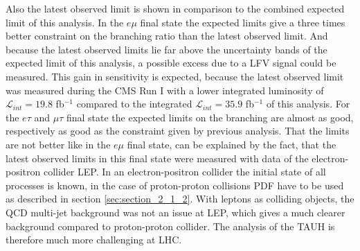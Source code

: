 Also the latest observed limit is shown in comparison to the combined expected limit of this analysis. In the $e\mu$ final state the expected limits give a three times better constraint on the branching ratio than the latest observed limit. And because the latest observed limits lie far above the uncertainty bands of the expected limit of this analysis, a possible excess due to a \gls{LFV} signal could be measured. This gain in sensitivity is expected, because the latest observed limit was measured during the \gls{CMS} Run I with a lower integrated luminosity of $\mathcal{L}_{int} = 19.8$ fb$^{-1}$ compared to the integrated $\mathcal{L}_{int} = 35.9$ fb$^{-1}$ of this analysis. For the $e\tau$ and $\mu\tau$ final state the expected limits on the branching are almost as good, respectively as good as the constraint given by previous analysis. That the limits are not better like in the $e\mu$ final state, can be explained by the fact, that the latest observed limits in this final state were measured with data of the electron-positron collider \gls{LEP}. In an electron-positron collider the initial state of all processes is known, in the case of proton-proton collisions \gls{PDF} have to be used as described in section \ref{sec:section_2_1_2}. With leptons as colliding objects, the \gls{QCD} multi-jet background was not an issue at \gls{LEP}, which gives a much clearer background compared to proton-proton collider. The analysis of the \gls{TAUH} is therefore much more challenging at \gls{LHC}. 

\newpage


